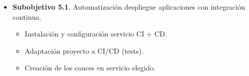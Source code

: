 \begin{text}
\begin{itemize}
                                \begin{itemize}
                                        \item \textbf{Subobjetivo 5.1}. Automatización despliegue aplicaciones con integración continua.
                                        \begin{itemize}
                                                \item Instalación y configuración servicio CI + CD.
                                                \item Adaptación proyecto a CI/CD (tests).
                                                \item Creación de los cauces en servicio elegido.
                                        \end{itemize}
                                \end{itemize}
                        \end{itemize}
                \end{text}

